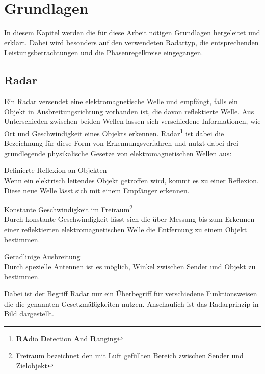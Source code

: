 \chapter{Grundlagen}
In diesem Kapitel werden die für diese Arbeit nötigen Grundlagen hergeleitet und erklärt. Dabei wird besonders auf den verwendeten Radartyp, die entsprechenden Leistungsbetrachtungen und die Phasenregelkreise eingegangen.  
\section{Radar}
Ein Radar versendet eine elektromagnetische Welle und empfängt, falls ein Objekt in Ausbreitungsrichtung vorhanden ist, die davon reflektierte Welle. Aus Unterschieden zwischen beiden Wellen lassen sich verschiedene Informationen, wie Ort und Geschwindigkeit eines Objekts erkennen. Radar\footnote{\textbf{RA}dio \textbf{D}etection \textbf{A}nd \textbf{R}anging} ist dabei die Bezeichnung für diese Form von Erkennungsverfahren und nutzt dabei drei grundlegende physikalische Gesetze von elektromagnetischen Wellen aus:
\begin{description}
\item Definierte Reflexion an Objekten \\
Wenn ein elektrisch leitendes Objekt getroffen wird, kommt es zu einer Reflexion. Diese neue Welle lässt sich mit einem Empfänger erkennen. 
\item Konstante Geschwindigkeit im Freiraum\footnote{Freiraum bezeichnet den mit Luft gefüllten Bereich zwischen Sender und Zielobjekt} \\
Durch konstante Geschwindigkeit lässt sich die über Messung bis zum Erkennen einer reflektierten elektromagnetischen Welle die Entfernung zu einem Objekt bestimmen. 
\item Geradlinige Ausbreitung \\
Durch spezielle Antennen ist es möglich, Winkel zwischen Sender und Objekt zu bestimmen.
\end{description}
Dabei ist der Begriff Radar nur ein Überbegriff für verschiedene Funktionsweisen die die genannten Gesetzmäßigkeiten nutzen. Anschaulich ist das Radarprinzip in Bild dargestellt.


